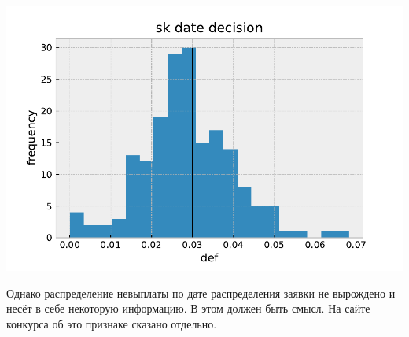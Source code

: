 \documentclass[russian, 10pt]{beamer}
\begin{document}
\begin{frame}

\includegraphics[scale=0.7]{images/sk_date_decision.pdf}

Однако распределение невыплаты по дате распределения заявки не вырождено и несёт в себе некоторую информацию. В этом должен быть смысл. На сайте конкурса об это признаке сказано отдельно.

\end{frame}
\end{document}
